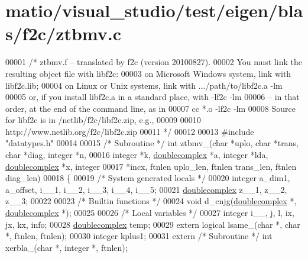 \hypertarget{matio_2visual__studio_2test_2eigen_2blas_2f2c_2ztbmv_8c_source}{}\section{matio/visual\+\_\+studio/test/eigen/blas/f2c/ztbmv.c}
\label{matio_2visual__studio_2test_2eigen_2blas_2f2c_2ztbmv_8c_source}

\begin{DoxyCode}
00001 \textcolor{comment}{/* ztbmv.f -- translated by f2c (version 20100827).}
00002 \textcolor{comment}{   You must link the resulting object file with libf2c:}
00003 \textcolor{comment}{    on Microsoft Windows system, link with libf2c.lib;}
00004 \textcolor{comment}{    on Linux or Unix systems, link with .../path/to/libf2c.a -lm}
00005 \textcolor{comment}{    or, if you install libf2c.a in a standard place, with -lf2c -lm}
00006 \textcolor{comment}{    -- in that order, at the end of the command line, as in}
00007 \textcolor{comment}{        cc *.o -lf2c -lm}
00008 \textcolor{comment}{    Source for libf2c is in /netlib/f2c/libf2c.zip, e.g.,}
00009 \textcolor{comment}{}
00010 \textcolor{comment}{        http://www.netlib.org/f2c/libf2c.zip}
00011 \textcolor{comment}{*/}
00012 
00013 \textcolor{preprocessor}{#include "datatypes.h"}
00014 
00015 \textcolor{comment}{/* Subroutine */} \textcolor{keywordtype}{int} ztbmv\_(\textcolor{keywordtype}{char} *uplo, \textcolor{keywordtype}{char} *trans, \textcolor{keywordtype}{char} *diag, integer *n, 
00016     integer *k, \hyperlink{structdoublecomplex}{doublecomplex} *a, integer *lda, \hyperlink{structdoublecomplex}{doublecomplex} *x, integer 
00017     *incx, ftnlen uplo\_len, ftnlen trans\_len, ftnlen diag\_len)
00018 \{
00019     \textcolor{comment}{/* System generated locals */}
00020     integer a\_dim1, a\_offset, i\_\_1, i\_\_2, i\_\_3, i\_\_4, i\_\_5;
00021     \hyperlink{structdoublecomplex}{doublecomplex} z\_\_1, z\_\_2, z\_\_3;
00022 
00023     \textcolor{comment}{/* Builtin functions */}
00024     \textcolor{keywordtype}{void} d\_cnjg(\hyperlink{structdoublecomplex}{doublecomplex} *, \hyperlink{structdoublecomplex}{doublecomplex} *);
00025 
00026     \textcolor{comment}{/* Local variables */}
00027     integer i\_\_, j, l, ix, jx, kx, info;
00028     \hyperlink{structdoublecomplex}{doublecomplex} temp;
00029     \textcolor{keyword}{extern} logical lsame\_(\textcolor{keywordtype}{char} *, \textcolor{keywordtype}{char} *, ftnlen, ftnlen);
00030     integer kplus1;
00031     \textcolor{keyword}{extern} \textcolor{comment}{/* Subroutine */} \textcolor{keywordtype}{int} xerbla\_(\textcolor{keywordtype}{char} *, integer *, ftnlen);

\end{DoxyCode}
